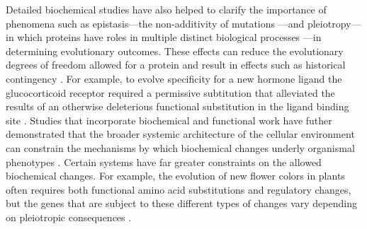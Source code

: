 Detailed biochemical studies have also helped to clarify the importance
of phenomena such as epistasis---the non-additivity of mutations \citep{harms_historical_2014,mackay_epistasis_2014,starr_epistasis_2016,sailer_detecting_2017}---and
pleiotropy---in which proteins have roles in multiple distinct biological
processes \citep{wolf_contribution_2006,wagner_gene_2008}---in determining
evolutionary outcomes. These effects can reduce the evolutionary degrees
of freedom allowed for a protein and result in effects such as historical
contingency \citep{blount_historical_2008,harms_historical_2014}.
For example, to evolve specificity for a new hormone ligand the glucocorticoid
receptor required a permissive subtitution that alleviated the results
of an otherwise deleterious functional substitution in the ligand
binding site \citep{harms_historical_2014}. Studies that incorporate
biochemical and functional work have futher demonstrated that the
broader systemic architecture of the cellular environment can constrain
the mechanisms by which biochemical changes underly organismal phenotypes
\citep{des_marais_escape_2008,smith_gene_2011,smith_functional_2013,sorrells_intersecting_2015}.
Certain systems have far greater constraints on the allowed biochemical
changes. For example, the evolution of new flower colors in plants
often requires both functional amino acid substitutions and regulatory
changes, but the genes that are subject to these different types of
changes vary depending on pleiotropic consequences \citep{streisfeld_altered_2009,streisfeld_genetic_2009,wessinger_lessons_2012,wessinger_predictability_2014}. 

